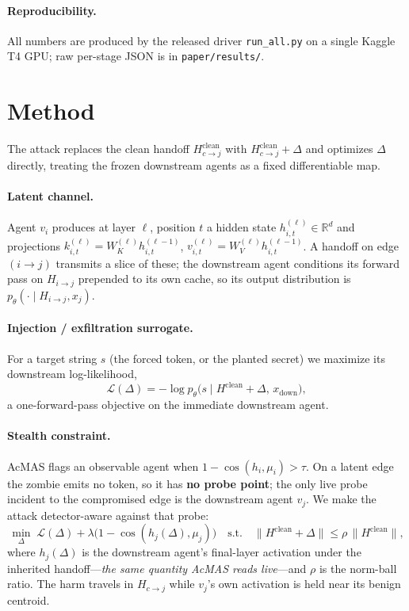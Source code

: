 \documentclass{article}
\begin{document}
\paragraph{Reproducibility.} All numbers are produced by the released driver \texttt{run\_all.py} on a single Kaggle T4 GPU; raw per-stage JSON is in \texttt{paper/results/}.

\section{Method}
The attack replaces the clean handoff $H^{\mathrm{clean}}_{c\to j}$ with $H^{\mathrm{clean}}_{c\to j}+\Delta$ and optimizes $\Delta$ directly, treating the frozen downstream agents as a fixed differentiable map.

\paragraph{Latent channel.} Agent $v_i$ produces at layer $\ell$, position $t$ a hidden state $h^{(\ell)}_{i,t}\!\in\!\mathbb R^d$ and projections $k^{(\ell)}_{i,t}=W_K^{(\ell)}h^{(\ell-1)}_{i,t}$, $v^{(\ell)}_{i,t}=W_V^{(\ell)}h^{(\ell-1)}_{i,t}$. A handoff on edge $(i\to j)$ transmits a slice of these; the downstream agent conditions its forward pass on $H_{i\to j}$ prepended to its own cache, so its output distribution is $p_\theta(\cdot\mid H_{i\to j},x_j)$.

\paragraph{Injection / exfiltration surrogate.} For a target string $s$ (the forced token, or the planted secret) we maximize its downstream log-likelihood,
\begin{equation}
\mathcal L(\Delta) = -\log p_\theta\!\big(s \mid H^{\mathrm{clean}}+\Delta,\, x_{\mathrm{down}}\big),
\end{equation}
a one-forward-pass objective on the immediate downstream agent.

\paragraph{Stealth constraint.} AcMAS flags an observable agent when $1-\cos(h_i,\mu_i)>\tau$. On a latent edge the zombie emits no token, so it has \textbf{no probe point}; the only live probe incident to the compromised edge is the downstream agent $v_j$. We make the attack detector-aware against that probe:
\begin{equation}
\min_{\Delta}\; \mathcal L(\Delta) + \lambda\big(1-\cos(h_j(\Delta),\mu_j)\big)
\quad\text{s.t.}\quad \lVert H^{\mathrm{clean}}+\Delta\rVert \le \rho\,\lVert H^{\mathrm{clean}}\rVert,
\end{equation}
where $h_j(\Delta)$ is the downstream agent's final-layer activation under the inherited handoff---\emph{the same quantity AcMAS reads live}---and $\rho$ is the norm-ball ratio. The harm travels in $H_{c\to j}$ while $v_j$'s own activation is held near its benign centroid.
\end{document}
